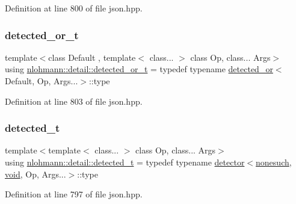 Definition at line 800 of file json.\+hpp.

\mbox{\label{namespacenlohmann_1_1detail_a7ac5b8ef0363101275a2827b3b117dcf}} 
\subsubsection{\texorpdfstring{detected\_or\_t}{detected\_or\_t}}
{\footnotesize\ttfamily template$<$class Default , template$<$ class... $>$ class Op, class... Args$>$ \\
using \mbox{\hyperlink{namespacenlohmann_1_1detail_a7ac5b8ef0363101275a2827b3b117dcf}{nlohmann\+::detail\+::detected\+\_\+or\+\_\+t}} = typedef typename \mbox{\hyperlink{namespacenlohmann_1_1detail_a240ce21919ab08e8a6cb3a5cfa412bce}{detected\+\_\+or}}$<$Default, Op, Args...$>$\+::type}



Definition at line 803 of file json.\+hpp.

\mbox{\label{namespacenlohmann_1_1detail_a37e97a32d0b94ce5f745427e4e40204d}} 
\subsubsection{\texorpdfstring{detected\_t}{detected\_t}}
{\footnotesize\ttfamily template$<$template$<$ class... $>$ class Op, class... Args$>$ \\
using \mbox{\hyperlink{namespacenlohmann_1_1detail_a37e97a32d0b94ce5f745427e4e40204d}{nlohmann\+::detail\+::detected\+\_\+t}} = typedef typename \mbox{\hyperlink{structnlohmann_1_1detail_1_1detector}{detector}}$<$\mbox{\hyperlink{structnlohmann_1_1detail_1_1nonesuch}{nonesuch}}, \mbox{\hyperlink{namespacenlohmann_1_1detail_a59fca69799f6b9e366710cb9043aa77d}{void}}, Op, Args...$>$\+::type}



Definition at line 797 of file json.\+hpp.

\mbox{\label{namespacenlohmann_1_1detail_a3603b59a17d1c5e15050743b847992f2}} 
